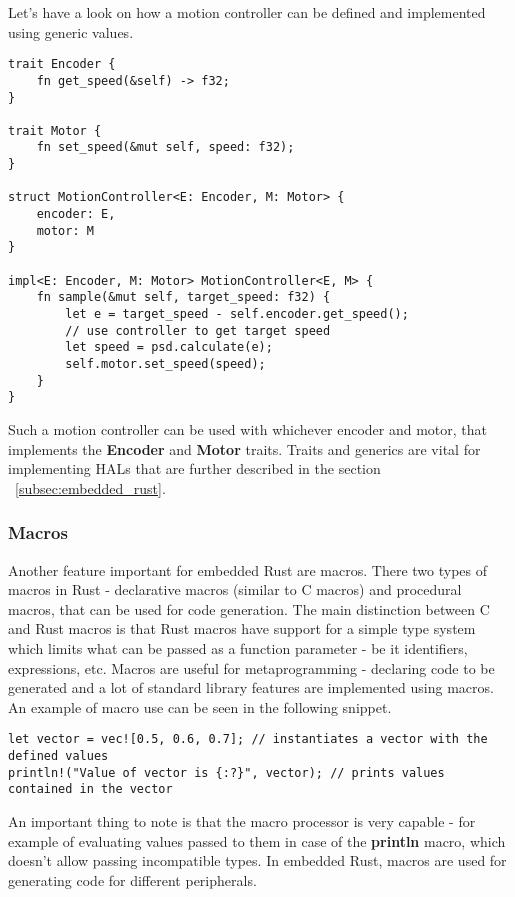 Let's have a look on how a motion controller can be defined and implemented using generic values.

\begin{lstlisting}
trait Encoder {
    fn get_speed(&self) -> f32;
}

trait Motor {
    fn set_speed(&mut self, speed: f32);
}

struct MotionController<E: Encoder, M: Motor> {
    encoder: E,
    motor: M
}

impl<E: Encoder, M: Motor> MotionController<E, M> {
    fn sample(&mut self, target_speed: f32) {
        let e = target_speed - self.encoder.get_speed();
        // use controller to get target speed
        let speed = psd.calculate(e);
        self.motor.set_speed(speed);
    }
}
\end{lstlisting}

Such a motion controller can be used with whichever encoder and motor, that implements the \textbf{Encoder} and \textbf{Motor} traits.
Traits and generics are vital for implementing HALs that are further described in the section ~\ref{subsec:embedded_rust}.

\newpage
\subsubsection{Macros}
Another feature important for embedded Rust are macros.
There two types of macros in Rust - declarative macros (similar to C macros) and procedural macros, that can be used for code generation.
The main distinction between C and Rust macros is that Rust macros have support for a simple type system which limits what can be passed as a function parameter - be it identifiers, expressions, etc.
Macros are useful for metaprogramming - declaring code to be generated and a lot of standard library features are implemented using macros.
An example of macro use can be seen in the following snippet.
\begin{lstlisting}
let vector = vec![0.5, 0.6, 0.7]; // instantiates a vector with the defined values
println!("Value of vector is {:?}", vector); // prints values contained in the vector
\end{lstlisting}

An important thing to note is that the macro processor is very capable - for example of evaluating values passed to them in case of the \textbf{println} macro, which doesn't allow passing incompatible types.
In embedded Rust, macros are used for generating code for different peripherals.

